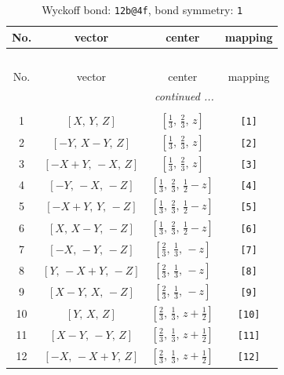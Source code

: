 \documentclass[fleqn,8pt]{jsarticle}
\begin{document}
\begin{longtable}{cccc}
\caption{Wyckoff bond: {\tt 12b@4f}, bond symmetry: {\tt 1}}
 \\
 \hline \hline
No. & vector & center & mapping \\ \hline \endfirsthead

\multicolumn{3}{l}{\tablename\ \thetable{}} \\
 \hline \hline
No. & vector & center & mapping \\ \hline \endhead

 \hline \hline
\multicolumn{3}{r}{\footnotesize\it continued ...} \\ \endfoot

 \hline \hline
\multicolumn{3}{r}{} \\ \endlastfoot

1 & $\left[ X,\, Y,\, Z \right]$ & $\left[ \frac{1}{3},\, \frac{2}{3},\, z \right]$ & {\tt [1]} \\ \hline
2 & $\left[ - Y,\, X - Y,\, Z \right]$ & $\left[ \frac{1}{3},\, \frac{2}{3},\, z \right]$ & {\tt [2]} \\ \hline
3 & $\left[ - X + Y,\, - X,\, Z \right]$ & $\left[ \frac{1}{3},\, \frac{2}{3},\, z \right]$ & {\tt [3]} \\ \hline
4 & $\left[ - Y,\, - X,\, - Z \right]$ & $\left[ \frac{1}{3},\, \frac{2}{3},\, \frac{1}{2} - z \right]$ & {\tt [4]} \\ \hline
5 & $\left[ - X + Y,\, Y,\, - Z \right]$ & $\left[ \frac{1}{3},\, \frac{2}{3},\, \frac{1}{2} - z \right]$ & {\tt [5]} \\ \hline
6 & $\left[ X,\, X - Y,\, - Z \right]$ & $\left[ \frac{1}{3},\, \frac{2}{3},\, \frac{1}{2} - z \right]$ & {\tt [6]} \\ \hline
7 & $\left[ - X,\, - Y,\, - Z \right]$ & $\left[ \frac{2}{3},\, \frac{1}{3},\, - z \right]$ & {\tt [7]} \\ \hline
8 & $\left[ Y,\, - X + Y,\, - Z \right]$ & $\left[ \frac{2}{3},\, \frac{1}{3},\, - z \right]$ & {\tt [8]} \\ \hline
9 & $\left[ X - Y,\, X,\, - Z \right]$ & $\left[ \frac{2}{3},\, \frac{1}{3},\, - z \right]$ & {\tt [9]} \\ \hline
10 & $\left[ Y,\, X,\, Z \right]$ & $\left[ \frac{2}{3},\, \frac{1}{3},\, z + \frac{1}{2} \right]$ & {\tt [10]} \\ \hline
11 & $\left[ X - Y,\, - Y,\, Z \right]$ & $\left[ \frac{2}{3},\, \frac{1}{3},\, z + \frac{1}{2} \right]$ & {\tt [11]} \\ \hline
12 & $\left[ - X,\, - X + Y,\, Z \right]$ & $\left[ \frac{2}{3},\, \frac{1}{3},\, z + \frac{1}{2} \right]$ & {\tt [12]} \\
\end{longtable}
\end{document}
